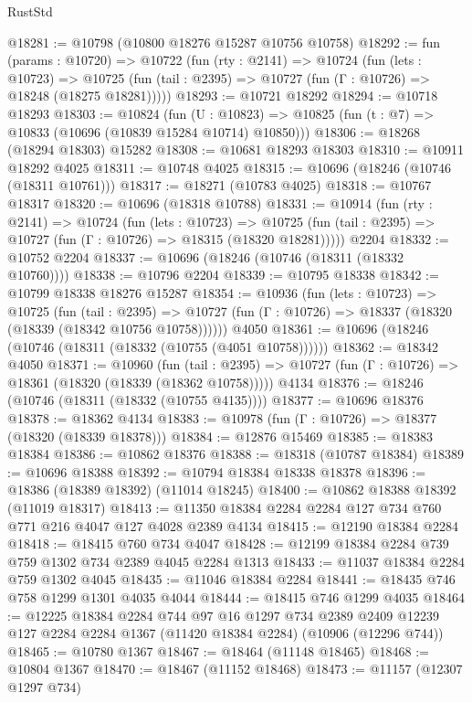 \begin{lexlean}{RustStd}
\begin{coremodule}
@18281 := @10798 (@10800 @18276 @15287 @10756 @10758)
@18292 := fun (params : @10720) =>
  @10722
    (fun (rty : @2141) =>
    @10724
      (fun (lets : @10723) =>
      @10725 (fun (tail : @2395) => @10727 (fun (Γ : @10726) => @18248 (@18275 @18281)))))
@18293 := @10721 @18292
@18294 := @10718 @18293
@18303 := @10824
    (fun (U : @10823) => @10825 (fun (t : @7) => @10833 (@10696 (@10839 @15284 @10714) @10850)))
@18306 := @18268 (@18294 @18303) @15282
@18308 := @10681 @18293 @18303
@18310 := @10911 @18292 @4025
@18311 := @10748 @4025
@18315 := @10696 (@18246 (@10746 (@18311 @10761)))
@18317 := @18271 (@10783 @4025)
@18318 := @10767 @18317
@18320 := @10696 (@18318 @10788)
@18331 := @10914
    (fun (rty : @2141) =>
    @10724
      (fun (lets : @10723) =>
      @10725 (fun (tail : @2395) => @10727 (fun (Γ : @10726) => @18315 (@18320 @18281)))))
    @2204
@18332 := @10752 @2204
@18337 := @10696 (@18246 (@10746 (@18311 (@18332 @10760))))
@18338 := @10796 @2204
@18339 := @10795 @18338
@18342 := @10799 @18338 @18276 @15287
@18354 := @10936
    (fun (lets : @10723) =>
    @10725
      (fun (tail : @2395) =>
      @10727 (fun (Γ : @10726) => @18337 (@18320 (@18339 (@18342 @10756 @10758))))))
    @4050
@18361 := @10696 (@18246 (@10746 (@18311 (@18332 (@10755 (@4051 @10758))))))
@18362 := @18342 @4050
@18371 := @10960
    (fun (tail : @2395) => @10727 (fun (Γ : @10726) => @18361 (@18320 (@18339 (@18362 @10758)))))
    @4134
@18376 := @18246 (@10746 (@18311 (@18332 (@10755 @4135))))
@18377 := @10696 @18376
@18378 := @18362 @4134
@18383 := @10978 (fun (Γ : @10726) => @18377 (@18320 (@18339 @18378)))
@18384 := @12876 @15469
@18385 := @18383 @18384
@18386 := @10862 @18376
@18388 := @18318 (@10787 @18384)
@18389 := @10696 @18388
@18392 := @10794 @18384 @18338 @18378
@18396 := @18386 (@18389 @18392) (@11014 @18245)
@18400 := @10862 @18388 @18392 (@11019 @18317)
@18413 := @11350 @18384 @2284 @2284 @127 @734 @760 @771 @216 @4047 @127 @4028 @2389 @4134
@18415 := @12190 @18384 @2284
@18418 := @18415 @760 @734 @4047
@18428 := @12199 @18384 @2284 @739 @759 @1302 @734 @2389 @4045 @2284 @1313
@18433 := @11037 @18384 @2284 @759 @1302 @4045
@18435 := @11046 @18384 @2284
@18441 := @18435 @746 @758 @1299 @1301 @4035 @4044
@18444 := @18415 @746 @1299 @4035
@18464 := @12225
    @18384
    @2284
    @744
    @97
    @16
    @1297
    @734
    @2389
    @2409
    @12239
    @127
    @2284
    @2284
    @1367
    (@11420 @18384 @2284)
    (@10906 (@12296 @744))
@18465 := @10780 @1367
@18467 := @18464 (@11148 @18465)
@18468 := @10804 @1367
@18470 := @18467 (@11152 @18468)
@18473 := @11157 (@12307 @1297 @734)

\end{coremodule}
\end{lexlean}
